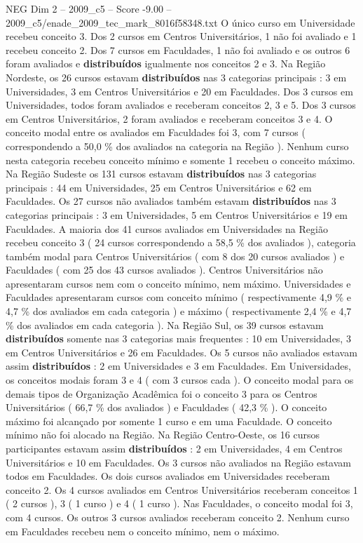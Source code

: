 \begin{textsample}{NEG Dim 2 – 2009\_c5 – Score -9.00 – 2009\_c5/enade\_2009\_tec\_mark\_8016f58348.txt}
O único curso em Universidade recebeu conceito 3.
Dos 2 cursos em Centros Universitários, 1 não foi avaliado e 1 recebeu conceito 2.
Dos 7 cursos em Faculdades, 1 não foi avaliado e os outros 6 foram avaliados e \textbf{distribuídos} igualmente nos conceitos 2 e 3.
Na Região Nordeste, os 26 cursos estavam \textbf{distribuídos} nas 3 categorias principais : 3 em Universidades, 3 em Centros Universitários e 20 em Faculdades.
Dos 3 cursos em Universidades, todos foram avaliados e receberam conceitos 2, 3 e 5.
Dos 3 cursos em Centros Universitários, 2 foram avaliados e receberam conceitos 3 e 4.
O conceito modal entre os avaliados em Faculdades foi 3, com 7 cursos ( correspondendo a 50,0 \% dos avaliados na categoria na Região ).
Nenhum curso nesta categoria recebeu conceito mínimo e somente 1 recebeu o conceito máximo.
Na Região Sudeste os 131 cursos estavam \textbf{distribuídos} nas 3 categorias principais : 44 em Universidades, 25 em Centros Universitários e 62 em Faculdades.
Os 27 cursos não avaliados também estavam \textbf{distribuídos} nas 3 categorias principais : 3 em Universidades, 5 em Centros Universitários e 19 em Faculdades.
A maioria dos 41 cursos avaliados em Universidades na Região recebeu conceito 3 ( 24 cursos correspondendo a 58,5 \% dos avaliados ), categoria também modal para Centros Universitários ( com 8 dos 20 cursos avaliados ) e Faculdades ( com 25 dos 43 cursos avaliados ).
Centros Universitários não apresentaram cursos nem com o conceito mínimo, nem máximo.
Universidades e Faculdades apresentaram cursos com conceito mínimo ( respectivamente 4,9 \% e 4,7 \% dos avaliados em cada categoria ) e máximo ( respectivamente 2,4 \% e 4,7 \% dos avaliados em cada categoria ).
Na Região Sul, os 39 cursos estavam \textbf{distribuídos} somente nas 3 categorias mais frequentes : 10 em Universidades, 3 em Centros Universitários e 26 em Faculdades.
Os 5 cursos não avaliados estavam assim \textbf{distribuídos} : 2 em Universidades e 3 em Faculdades.
Em Universidades, os conceitos modais foram 3 e 4 ( com 3 cursos cada ).
O conceito modal para os demais tipos de Organização Acadêmica foi o conceito 3 para os Centros Universitários ( 66,7 \% dos avaliados ) e Faculdades ( 42,3 \% ).
O conceito máximo foi alcançado por somente 1 curso e em uma Faculdade.
O conceito mínimo não foi alocado na Região.
Na Região Centro-Oeste, os 16 cursos participantes estavam assim \textbf{distribuídos} : 2 em Universidades, 4 em Centros Universitários e 10 em Faculdades.
Os 3 cursos não avaliados na Região estavam todos em Faculdades.
Os dois cursos avaliados em Universidades receberam conceito 2.
Os 4 cursos avaliados em Centros Universitários receberam conceitos 1 ( 2 cursos ), 3 ( 1 curso ) e 4 ( 1 curso ).
Nas Faculdades, o conceito modal foi 3, com 4 cursos.
Os outros 3 cursos avaliados receberam conceito 2.
Nenhum curso em Faculdades recebeu nem o conceito mínimo, nem o máximo.

\end{textsample}

